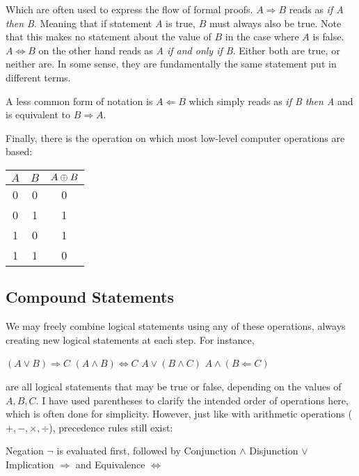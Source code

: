 {Which are often used to express the flow of formal proofs.
\(A \Rightarrow B\) reads as \emph{if A then B}. Meaning that if statement \(A\)
is true, \(B\) must always also be true. Note that this makes no statement
about the value of \(B\) in the case where \(A\) is false.
\(A \Leftrightarrow B\) on the other hand reads as \emph{A if and only if B}.
Either both are true, or neither are. In some sense, they are fundamentally the
same statement put in different terms.

A less common form of notation is \(A \Leftarrow B\) which simply reads as
\emph{if B then A} and is equivalent to \(B \Rightarrow A\).

Finally, there is the operation on which most low-level computer operations are
based:

\begin{tcolorbox}[colframe=gray!80, colback=white, boxrule=0.4pt, top=4pt, bottom=4pt]
  \begin{minipage}[t]{\textwidth}
    \centering
    \vspace{-10pt}
    \vspace{3pt}
    \begin{tabular}{cc c}
      \(A\) & \(B\) & \(A \oplus B\)\\
      \midrule
      0 & 0 & 0 \\
      0 & 1 & 1 \\
      1 & 0 & 1 \\
      1 & 1 & 0 \\
    \end{tabular}
  \end{minipage}
\end{tcolorbox}
}

\subsection{Compound Statements}
We may freely combine logical statements using any of these operations, always
creating new logical statements at each step. For instance,
\begin{example}
  \((A \lor B) \Rightarrow C\)
  \hfill
  \((A \land B) \Leftrightarrow C\)
  \hfill
  \(A \lor (B \land C)\)
  \hfill
  \(A \land (B \Leftarrow C)\)
\end{example}

are all logical statements that may be true or false, depending on the values of
\(A, B, C\).
I have used parentheses to clarify the intended order of operations here, which
is often done for simplicity. However, just like with arithmetic operations
(\(+, -, \times, \div\)), precedence rules still exist:
\begin{itemize}
  \ii{} Negation \(\neg\) is evaluated first, followed by
  \ii{} Conjunction \(\land\)
  \ii{} Disjunction \(\lor\)
  \ii{} Implication \(\Rightarrow\) and
  \ii{} Equivalence \(\Leftrightarrow\)
\end{itemize}

